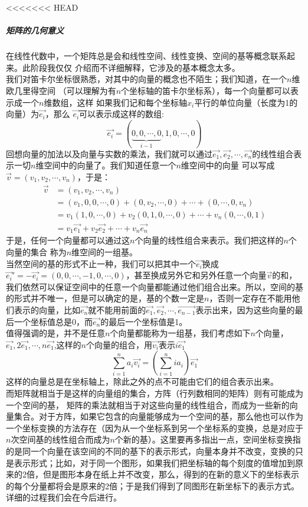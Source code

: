 \documentclass[a4paper,12pt]{ctexart}
\begin{document}
<<<<<<< HEAD
		\subparagraph{矩阵的几何意义}
		在线性代数中，一个矩阵总是会和线性空间、线性变换、空间的基等概念联系起来。此阶段我仅仅
		介绍而不详细解释，它涉及的基本概念太多。\\
		\indent
		我们对笛卡尔坐标很熟悉，对其中的向量的概念也不陌生；我们知道，在一个$n$维欧几里得空间
		（可以理解为有$n$个坐标轴的笛卡尔坐标系），每一个向量都可以表示成一个$n$维数组，这样
		如果我们记和每个坐标轴$x_i$平行的单位向量（长度为1的向量）为$\vec{e_i}$，那么
		$\vec{e_i}$可以表示成这样的数组:
		$$
		\vec{e_i} = (\underbrace{0,0,\cdots,0}_{i-1},1,0,\cdots,0)
		$$
		回想向量的加法以及向量与实数的乘法，我们就可以通过$\vec{e_1},\vec{e_2},\cdots
		,\vec{e_n}$的线性组合表示一切$n$维空间中的向量了。我们知道任意一个$n$维空间中的向量
		可以写成$\vec{v}=(v_1,v_2,\cdots,v_n)$，于是：
		\begin{align*}
		\vec{v} &= (v_1,v_2,\cdots,v_n)\\
				&= (v_1,0,0,\cdots,0)+(0,v_2,\cdots,0)+\cdots+(0,\cdots,0,v_n)\\
				&=v_1(1,0,\cdots,0)+v_2(0,1,0,\cdots,0)+\cdots+v_n(0,\cdots,0,1)\\
				&=v_1\vec{e_1}+v_2\vec{e_2}+\cdots+v_n\vec{e_n}
		\end{align*}
		于是，任何一个向量都可以通过这$n$个向量的线性组合来表示。我们把这样的$n$个向量的集合
		称为$n$维空间的一组基。\\
		\indent
		当然空间的基的形式不止一种，我们可以把其中一个$\vec{e_i}$换成$\vec{e_i}'=-\vec{e_i}=(0,0,\cdots,-1,0,\cdots,0)$，甚至换成另外它和另外任意一个向量$\vec{v}$的和，
		我们依然可以保证空间中的任意一个向量都能通过他们组合出来。所以，空间的基的形式并不唯一，但是可以确定的是，基的个数一定是$n$，否则一定存在不能用他们表示的向量，比如$\vec{e_n}$就不能用前面的$\vec{e_1},\vec{e_2},\cdots,\vec{e_{n-1}}$表示出来，因为这些向量的最后一个坐标值总是0，而$\vec{e_n}$的最后一个坐标值是1。\\
		\indent
		值得强调的是，并不是任意$n$个向量都能称为一组基，我们考虑如下$n$个向量，$\vec{e_1},2\vec{e_1},\cdots,n\vec{e_1}$,这样的$n$个向量的组合，用$\vec{v_i}$表示$i\vec{e_1}$
		$$
		\sum_{i=1}^{n}a_i\vec{v_i}=(\sum_{i=1}^{n}ia_i)\vec{e_1}
		$$
		这样的向量总是在坐标轴上，除此之外的点不可能由它们的组合表示出来。\\
		\indent
		而矩阵就相当于是这样的向量组的集合，方阵（行列数相同的矩阵）则有可能成为一个空间的基，
		矩阵的乘法就相当于对这些向量的线性组合，而成为一些新的向量集合。对于方阵，如果它包含的向量能够成为一个空间的基，那么他也可以作为一个坐标变换的方法存在（因为从一个坐标系到另一个坐标系的变换，总是对应于$n$次空间基的线性组合而成为$n$个新的基）。这里要再多指出一点，空间坐标变换指的是同一个向量在该空间的不同的基下的表示形式，向量本身并不改变，变换的只是表示形式；比如，对于同一个图形，如果我们把坐标轴的每个刻度的值增加到原来的2倍，但是图形本身在纸上并不改变，那么，得到的在新的意义下的坐标表示的每个分量都将会是原来的2倍；于是我们得到了同图形在新坐标下的表示方式。详细的过程我们会在今后进行。\\
\end{document}
